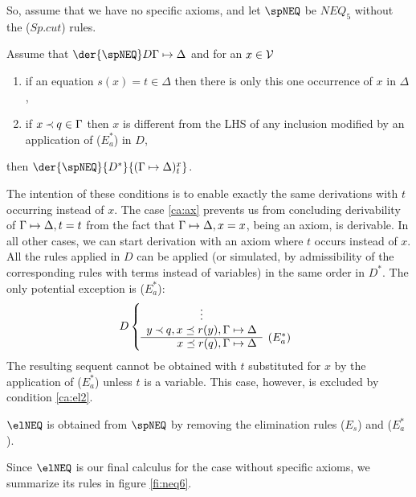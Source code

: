 So, assume that we have no specific axioms, and let $\spNEQ$ be $NEQ_5$
without the ($Sp.cut$) rules.
%
\begin{LEMMA}\label{le:ssp}
Assume that $\der{\spNEQ}D{\GSD}$ and for an $x\in{\cal V}$
\begin{enumerate}\MyLPar
\item\label{ca:ax} if an equation $s(x)=t \in \Delta$ then there is only this one
occurrence of $x$ in $\Delta$,
\item\label{ca:el2} if $x\mathbin{\prec} q \in\Gamma$ then $x$ is different from the LHS of any
inclusion modified by an application of ($E_a^*$) in $D$,
\end{enumerate}
\noindent
then $\der{\spNEQ}{D^*}{(\GSD)_t^x}$.
\end{LEMMA}
\begin{PROOF}
The intention of these conditions is to enable exactly the same derivations
with $t$ occurring instead of $x$.
The case \ref{ca:ax} prevents us from concluding derivability of $\Gamma\mathrel{\mapsto}\Delta, t=t$
from the fact that $\Gamma\mathrel{\mapsto}\Delta,x=x$, being an axiom, is derivable. 
In all other cases, we can
 start derivation with an axiom where $t$ occurs instead of $x$. All the
 rules applied in $D$ can be applied (or simulated, by admissibility of the
 corresponding rules with terms instead of variables) in the same order in
 $D^*$.
The only potential exception is ($E_a^*$):
\[ D \left \{ \begin{array}{rl}
 \multicolumn{1}{c}{\vdots} \\
 y\Incl q, x\preceq r(y),\GSD  \\ \cline{1-1}
 x\preceq r(q),\GSD & \rabove{(E_a^*)} \end{array} \right . \]
The resulting sequent cannot be obtained with $t$ substituted for $x$ by the
application of ($E_a^*$) unless $t$ is a variable. This case, however, is
excluded by condition \ref{ca:el2}.
\end{PROOF}

\begin{DEFINITION}\label{de:neq6}
 $\elNEQ$ is obtained from $\spNEQ$ by removing the elimination rules ($E_s$)
 and ($E_a^*$).
\end{DEFINITION}
\noindent
Since $\elNEQ$ is our final calculus for the case without specific axioms, we
summarize its rules in figure \ref{fi:neq6}. 

